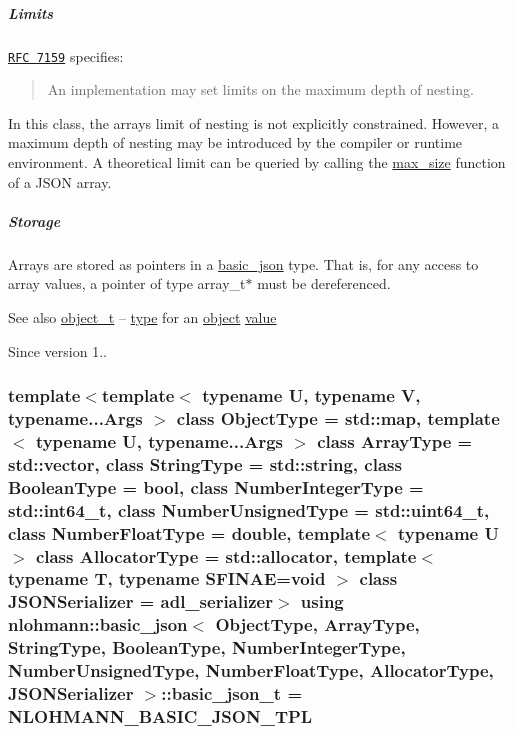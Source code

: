 \subparagraph*{Limits}

\href{http://rfc7159.net/rfc7159}{\tt R\+FC 7159} specifies\+: \begin{quote}
An implementation may set limits on the maximum depth of nesting. \end{quote}


In this class, the array\textquotesingle{}s limit of nesting is not explicitly constrained. However, a maximum depth of nesting may be introduced by the compiler or runtime environment. A theoretical limit can be queried by calling the \hyperlink{classnlohmann_1_1basic__json_a2f47d3c6a441c57dd2be00449fbb88e1}{max\+\_\+size} function of a J\+S\+ON array.

\subparagraph*{Storage}

Arrays are stored as pointers in a \hyperlink{classnlohmann_1_1basic__json}{basic\+\_\+json} type. That is, for any access to array values, a pointer of type {\ttfamily array\+\_\+t$\ast$} must be dereferenced.

\begin{DoxySeeAlso}{See also}
\hyperlink{classnlohmann_1_1basic__json_a0322396ca5cd4623bc816bf735377623}{object\+\_\+t} -- \hyperlink{classnlohmann_1_1basic__json_a2b2d781d7f2a4ee41bc0016e931cadf7}{type} for an \hyperlink{classnlohmann_1_1basic__json_a31f84ee15c4690ff705bed74736d04c6}{object} \hyperlink{classnlohmann_1_1basic__json_a404017aa52714a0a4bc79d5af7e4ad2b}{value}
\end{DoxySeeAlso}
\begin{DoxySince}{Since}
version 1.. 
\end{DoxySince}
\subsubsection[{\texorpdfstring{basic\+\_\+json\+\_\+t}{basic_json_t}}]{\setlength{\rightskip}{0pt plus 5cm}template$<$template$<$ typename U, typename V, typename...\+Args $>$ class Object\+Type = std\+::map, template$<$ typename U, typename...\+Args $>$ class Array\+Type = std\+::vector, class String\+Type  = std\+::string, class Boolean\+Type  = bool, class Number\+Integer\+Type  = std\+::int64\+\_\+t, class Number\+Unsigned\+Type  = std\+::uint64\+\_\+t, class Number\+Float\+Type  = double, template$<$ typename U $>$ class Allocator\+Type = std\+::allocator, template$<$ typename T, typename S\+F\+I\+N\+A\+E=void $>$ class J\+S\+O\+N\+Serializer = adl\+\_\+serializer$>$ using {\bf nlohmann\+::basic\+\_\+json}$<$ Object\+Type, Array\+Type, String\+Type, Boolean\+Type, Number\+Integer\+Type, Number\+Unsigned\+Type, Number\+Float\+Type, Allocator\+Type, J\+S\+O\+N\+Serializer $>$\+::{\bf basic\+\_\+json\+\_\+t} =  {\bf N\+L\+O\+H\+M\+A\+N\+N\+\_\+\+B\+A\+S\+I\+C\+\_\+\+J\+S\+O\+N\+\_\+\+T\+PL}\hspace{0.3cm}{\ttfamily [private]}}\hypertarget{classnlohmann_1_1basic__json_afff7860310ae69f29f8158a77ec0ef13}{}\label{classnlohmann_1_1basic__json_afff7860310ae69f29f8158a77ec0ef13}


